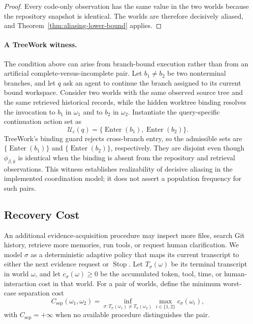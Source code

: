 \begin{proof}
Every code-only observation has the same value in the two worlds because the
repository snapshot is identical.  The worlds are therefore decisively aliased,
and Theorem~\ref{thm:aliasing-lower-bound} applies.
\end{proof}

\paragraph{A TreeWork witness.}
The condition above can arise from branch-bound execution rather than from an
artificial complete-versus-incomplete pair.  Let $b_1\neq b_2$ be two
nonterminal branches, and let $q$ ask an agent to continue the branch assigned
to its current bound workspace.  Consider two worlds with the same observed
source tree and the same retrieved historical records, while the hidden
worktree binding resolves the invocation to $b_1$ in $\omega_1$ and to $b_2$ in
$\omega_2$.  Instantiate the query-specific continuation action set as
\begin{equation}
\mathcal U_c(q)=\{\operatorname{Enter}(b_1),\operatorname{Enter}(b_2)\}.
\end{equation}
TreeWork's binding guard rejects cross-branch entry, so the admissible sets are
$\{\operatorname{Enter}(b_1)\}$ and $\{\operatorname{Enter}(b_2)\}$,
respectively.  They are disjoint even though $\phi_{\beta,k}$ is identical when
the binding is absent from the repository and retrieval observations.  This
witness establishes realizability of decisive aliasing in the implemented
coordination model; it does not assert a population frequency for such pairs.

\subsection{Recovery Cost}

An additional evidence-acquisition procedure may inspect more files, search Git
history, retrieve more memories, run tools, or request human clarification.  We
model $\sigma$ as a deterministic adaptive policy that maps its current
transcript to either the next evidence request or $\operatorname{Stop}$.  Let
$T_\sigma(\omega)$ be its terminal transcript in world $\omega$, and let
$c_\sigma(\omega)\ge 0$ be the accumulated token, tool, time, or
human-interaction cost in that world.  For a pair of worlds, define the minimum
worst-case separation cost
\begin{equation}
C_{\mathrm{sep}}(\omega_1,\omega_2)
=
\inf_{\sigma:
T_\sigma(\omega_1)\neq T_\sigma(\omega_2)}
\max_{i\in\{1,2\}}c_\sigma(\omega_i),
\label{eq:separation-cost}
\end{equation}
with $C_{\mathrm{sep}}=+\infty$ when no available procedure distinguishes the
pair.

